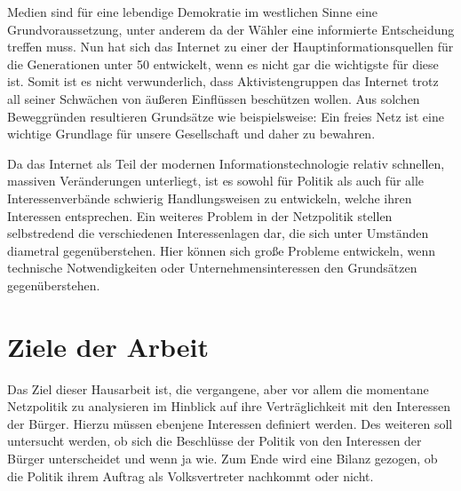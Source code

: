 \documentclass[
	12pt,
	a4paper,
	BCOR10mm,
	DIV14,
	listof=totoc,
	bibliography=totoc,
	headsepline
]{scrreprt}
\begin{document}
Medien sind für eine lebendige Demokratie im westlichen Sinne eine Grundvoraussetzung, unter anderem da der Wähler eine informierte Entscheidung treffen muss.
Nun hat sich das Internet zu einer der Hauptinformationsquellen für die Generationen unter 50 entwickelt, wenn es nicht gar die wichtigste für diese ist.
Somit ist es nicht verwunderlich, dass Aktivistengruppen das Internet trotz all seiner Schwächen von äußeren Einflüssen beschützen wollen.
Aus solchen Beweggründen resultieren Grundsätze wie beispielsweise: Ein freies Netz ist eine wichtige Grundlage für unsere Gesellschaft und daher zu bewahren. 

Da das Internet als Teil der modernen Informationstechnologie relativ schnellen, massiven Veränderungen unterliegt, ist es sowohl für Politik als auch für alle Interessenverbände schwierig Handlungsweisen zu entwickeln, welche ihren Interessen entsprechen.
Ein weiteres Problem in der Netzpolitik stellen selbstredend die verschiedenen Interessenlagen dar, die sich unter Umständen diametral gegenüberstehen.
Hier können sich große Probleme entwickeln, wenn technische Notwendigkeiten oder Unternehmensinteressen den Grundsätzen gegenüberstehen.

{}

\section{Ziele der Arbeit}
\label{aims}
Das Ziel dieser Hausarbeit ist, die vergangene, aber vor allem die momentane Netzpolitik zu analysieren im Hinblick auf ihre Verträglichkeit mit den Interessen der Bürger.
Hierzu müssen ebenjene Interessen definiert werden.
Des weiteren soll untersucht werden, ob sich die Beschlüsse der Politik von den Interessen der Bürger unterscheidet und wenn ja wie.
Zum Ende wird eine Bilanz gezogen, ob die Politik ihrem Auftrag als Volksvertreter nachkommt oder nicht.

\end{document}
